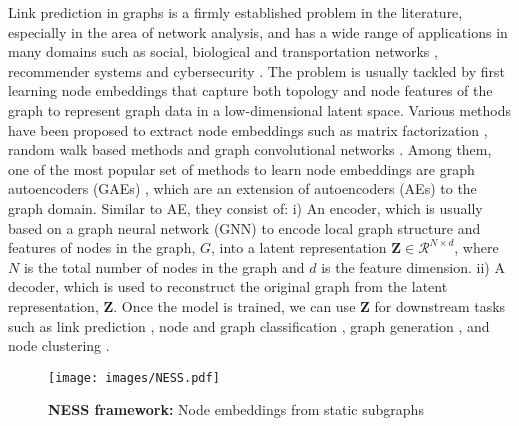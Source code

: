 \documentclass{article}
\begin{document}
Link prediction in graphs is a firmly established problem in the literature, especially in the area of network analysis, and has a wide range of applications in many domains such as social, biological and transportation networks \citep{zhang2020autosf, qi2006evaluation, chami2019hyperbolic}, recommender systems \citep{zhang2018link} and cybersecurity \citep{liben2003link}. The problem is usually tackled by first learning node embeddings that capture both topology and node features of the graph to represent graph data in a low-dimensional latent space. Various methods have been proposed to extract node embeddings such as matrix factorization \citep{ahmed2013distributed, cao2015grarep, katz1953new}, random walk based methods \citep{perozzi2014deepwalk, grover2016node2vec} and graph convolutional networks \citep{kipf2016semi, kipf2016variational,  hamilton2017inductive, chiang2019cluster}. Among them, one of the most popular set of methods to learn node embeddings are graph autoencoders (GAEs) \citep{kipf2016variational}, which are an extension of autoencoders (AEs) \citep{rumelhart1985learning} to the graph domain. Similar to AE, they consist of: i) An encoder, which is usually based on a graph neural network (GNN) to encode local graph structure and features of nodes in the graph, $G$, into a latent representation $\pmb{Z} \in \mathcal{R}^{N \times d}$, where $N$ is the total number of nodes in the graph and $d$ is the feature dimension. ii) A decoder, which is used to reconstruct the original graph from the latent representation, $\pmb{Z} $. Once the model is trained, we can use $\pmb{Z} $ for downstream tasks such as link prediction \citep{kipf2016variational, berg2017graph}, node and graph classification \citep{rong2019dropedge, kipf2016semi}, graph generation \citep{jin2018junction, simonovsky2018graphvae, samanta2020nevae}, and node clustering \citep{hasanzadeh2019semi, pan2018adversarially}.


\begin{figure*}[ht]
\vskip 0.2in
\begin{center}
\centerline{\texttt{[image: images/NESS.pdf]}}
\caption{\textbf{NESS framework:} Node embeddings from static subgraphs}\label{fig:subgraph_framework}
\end{center}
\vskip -0.2in
\end{figure*}
\end{document}
